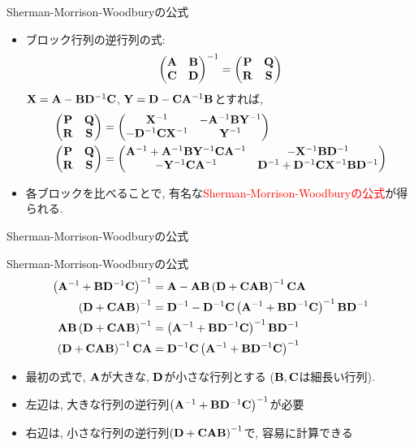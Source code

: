 \documentclass[dvipdfmx,notheorems,t]{beamer}
\begin{document}
\begin{frame}{Sherman-Morrison-Woodburyの公式}
\begin{itemize}
  \item ブロック行列の逆行列の式:
  $$\mqty(\vb{A} & \vb{B} \\ \vb{C} & \vb{D})^{-1} = \mqty(\vb{P} & \vb{Q} \\ \vb{R} & \vb{S})$$
  $\vb{X} = \vb{A} - \vb{B} \vb{D}^{-1} \vb{C}$, $\vb{Y} = \vb{D} - \vb{C} \vb{A}^{-1} \vb{B}$とすれば,
  \begin{align*}
    \mqty(\vb{P} & \vb{Q} \\ \vb{R} & \vb{S})
      &= \mqty(\vb{X}^{-1} & -\vb{A}^{-1} \vb{B} \vb{Y}^{-1} \\
        -\vb{D}^{-1} \vb{C} \vb{X}^{-1} & \vb{Y}^{-1}) \\
    \mqty(\vb{P} & \vb{Q} \\ \vb{R} & \vb{S})
      &= \mqty(\vb{A}^{-1} + \vb{A}^{-1} \vb{B} \vb{Y}^{-1} \vb{C} \vb{A}^{-1} &
        -\vb{X}^{-1} \vb{B} \vb{D}^{-1} \\
        -\vb{Y}^{-1} \vb{C} \vb{A}^{-1} &
        \vb{D}^{-1} + \vb{D}^{-1} \vb{C} \vb{X}^{-1} \vb{B} \vb{D}^{-1})
  \end{align*}
  \item 各ブロックを比べることで, 有名な\textcolor{red}{Sherman-Morrison-Woodburyの公式}が得られる.
\end{itemize}
\end{frame}

\begin{frame}{Sherman-Morrison-Woodburyの公式}
\begin{block}{Sherman-Morrison-Woodburyの公式}
  \begin{align*}
    \left( \vb{A}^{-1} + \vb{B} \vb{D}^{-1} \vb{C} \right)^{-1}
      &= \vb{A} - \vb{A} \vb{B}
        \left( \vb{D} + \vb{C} \vb{A} \vb{B} \right)^{-1} \vb{C} \vb{A} \\
    \left( \vb{D} + \vb{C} \vb{A} \vb{B} \right)^{-1}
      &= \vb{D}^{-1} - \vb{D}^{-1} \vb{C}
        \left( \vb{A}^{-1} + \vb{B} \vb{D}^{-1} \vb{C} \right)^{-1} \vb{B} \vb{D}^{-1} \\
    \vb{A} \vb{B} \left( \vb{D} + \vb{C} \vb{A} \vb{B} \right)^{-1}
      &= \left( \vb{A}^{-1} + \vb{B} \vb{D}^{-1} \vb{C} \right)^{-1} \vb{B} \vb{D}^{-1} \\
    \left( \vb{D} + \vb{C} \vb{A} \vb{B} \right)^{-1} \vb{C} \vb{A}
      &= \vb{D}^{-1} \vb{C} \left( \vb{A}^{-1} + \vb{B} \vb{D}^{-1} \vb{C} \right)^{-1}
  \end{align*}
\end{block}

\begin{itemize}
  \item 最初の式で, $\vb{A}$が大きな, $\vb{D}$が小さな行列とする ($\vb{B}, \vb{C}$は細長い行列).
  \item 左辺は, 大きな行列の逆行列$\left( \vb{A}^{-1} + \vb{B} \vb{D}^{-1} \vb{C} \right)^{-1}$が必要
  \item 右辺は, 小さな行列の逆行列$\left( \vb{D} + \vb{C} \vb{A} \vb{B} \right)^{-1}$で, 容易に計算できる
\end{itemize}
\end{frame}
\end{document}
